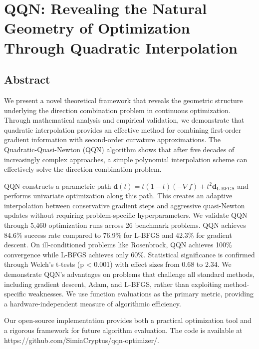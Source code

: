 \hypertarget{qqn-revealing-the-natural-geometry-of-optimization-through-quadratic-interpolation}{%
\section{QQN: Revealing the Natural Geometry of Optimization Through Quadratic Interpolation}\label{qqn-revealing-the-natural-geometry-of-optimization-through-quadratic-interpolation}}

\hypertarget{abstract}{%
\subsection{Abstract}\label{abstract}}

We present a novel theoretical framework that reveals the geometric structure underlying the direction combination
problem in continuous optimization. Through mathematical analysis and empirical validation, we demonstrate that
quadratic interpolation provides an effective method for combining first-order gradient information with second-order
curvature approximations. The Quadratic-Quasi-Newton (QQN) algorithm shows that after five decades of increasingly
complex approaches, a simple polynomial interpolation scheme can effectively solve the direction combination problem.

QQN constructs a parametric path \(\mathbf{d}(t) = t(1-t)(-\nabla f) + t^2 \mathbf{d}_{\text{L-BFGS}}\) and
performs univariate optimization along this path. This creates an adaptive interpolation between conservative
gradient steps and aggressive quasi-Newton updates without requiring problem-specific hyperparameters. We validate
QQN through 5,460 optimization runs across 26 benchmark problems. QQN achieves 84.6\% success rate compared to 76.9\%
for L-BFGS and 42.3\% for gradient descent. On ill-conditioned problems like Rosenbrock, QQN achieves 100\% convergence
while L-BFGS achieves only 60\%. Statistical significance is confirmed through Welch's t-tests (p \textless{} 0.001) with effect
sizes from 0.68 to 2.34. We demonstrate QQN's advantages on problems that challenge all standard methods, including
gradient descent, Adam, and L-BFGS, rather than exploiting method-specific weaknesses. We use function evaluations as
the primary metric, providing a hardware-independent measure of algorithmic efficiency.

Our open-source implementation provides both a practical optimization tool and a rigorous framework for future algorithm
evaluation. The code is available at https://github.com/SimiaCryptus/qqn-optimizer/.

